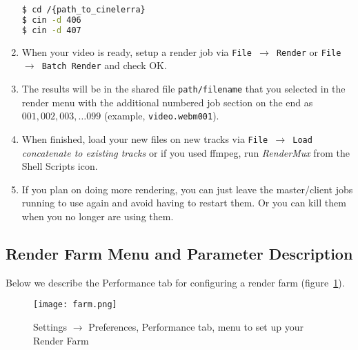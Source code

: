 \begin{enumerate}
\begin{lstlisting}[language=bash,numbers=none]
$ cd /{path_to_cinelerra}
$ cin -d 406
$ cin -d 407
    \end{lstlisting}
    \item When your video is ready, setup a render job via \texttt{File $\rightarrow$  Render} or \texttt{File $\rightarrow$  Batch Render} and check OK.
    \item The results will be in the shared file \texttt{path/filename} that you selected in the render menu with the
    additional numbered job section on the end as  $001, 002, 003, \dots 099$ (example, \texttt{video.webm001}).
    \item When finished, load your new files on new tracks via  \texttt{File  $\rightarrow$ Load} \textit{concatenate to existing tracks}  or if you used ffmpeg, run \textit{RenderMux} from the Shell Scripts icon.
    \item If you plan on doing more rendering, you can just leave the master/client jobs running to use again
    and avoid having to restart them.  Or you can kill them when you no longer are using them.
\end{enumerate}

\subsection{Render Farm Menu and Parameter Description}%
\label{sub:render_farm_parameter_description}

Below we describe the Performance tab for configuring a render farm (figure~\ref{fig:farm}).

\begin{figure}[htpb]
    \centering
    \texttt{[image: farm.png]}
    \caption{Settings $\rightarrow$ Preferences, Performance tab, menu to set up your Render Farm}
    \label{fig:farm}
\end{figure}


